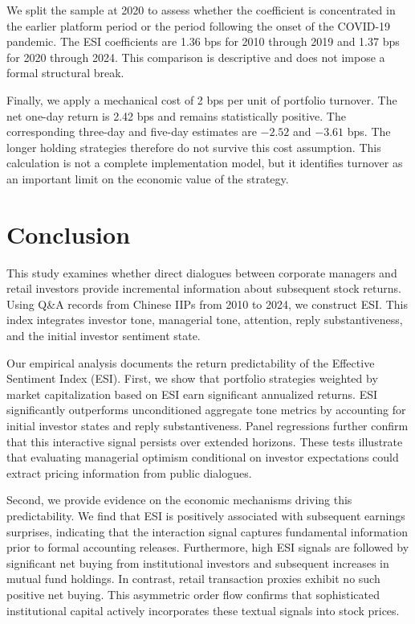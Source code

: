 \documentclass[12pt]{article}
\begin{document}
We split the sample at 2020 to assess whether the coefficient is concentrated in the earlier platform period or the period following the onset of the COVID-19 pandemic. The ESI coefficients are 1.36 bps for 2010 through 2019 and 1.37 bps for 2020 through 2024. This comparison is descriptive and does not impose a formal structural break.

Finally, we apply a mechanical cost of 2 bps per unit of portfolio turnover. The net one-day return is 2.42 bps and remains statistically positive. The corresponding three-day and five-day estimates are $-2.52$ and $-3.61$ bps. The longer holding strategies therefore do not survive this cost assumption. This calculation is not a complete implementation model, but it identifies turnover as an important limit on the economic value of the strategy.





\section{Conclusion}\label{sec:conclusion}

This study examines whether direct dialogues between corporate managers and retail investors provide incremental information about subsequent stock returns. Using Q\&A records from Chinese IIPs from 2010 to 2024, we construct ESI. This index integrates investor tone, managerial tone, attention, reply substantiveness, and the initial investor sentiment state.

Our empirical analysis documents the return predictability of the Effective Sentiment Index (ESI). First, we show that portfolio strategies weighted by market capitalization based on ESI earn significant annualized returns. ESI significantly outperforms unconditioned aggregate tone metrics by accounting for initial investor states and reply substantiveness. Panel regressions further confirm that this interactive signal persists over extended horizons. These tests illustrate that evaluating managerial optimism conditional on investor expectations could extract pricing information from public dialogues.

Second, we provide evidence on the economic mechanisms driving this predictability. We find that ESI is positively associated with subsequent earnings surprises, indicating that the interaction signal captures fundamental information prior to formal accounting releases. Furthermore, high ESI signals are followed by significant net buying from institutional investors and subsequent increases in mutual fund holdings. In contrast, retail transaction proxies exhibit no such positive net buying. This asymmetric order flow confirms that sophisticated institutional capital actively incorporates these textual signals into stock prices.
\end{document}
